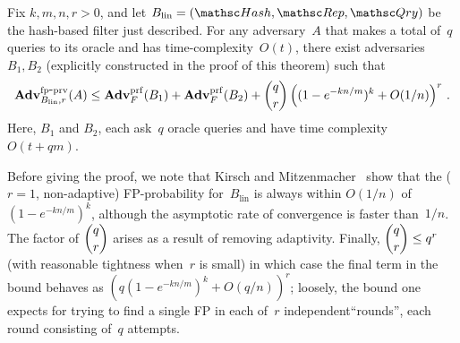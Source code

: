 \begin{theorem}\label{thm1}
Fix $k,m,n,r>0$, and let $B_\mathrm{lin}=(\Hash,\Rep,\Qry)$ be the hash-based filter just described. 
For any adversary~$A$ that makes a total of~$q$ queries to its oracle
and has time-complexity~$O(t)$,
there exist adversaries~$B_1,B_2$ (explicitly constructed in the proof of this theorem) such that
\[
\mathrm{\mathbf{Adv}}^{\mathrm{fp\mbox{-}prv}}_{B_{\mathrm{lin}},r}(A) \leq  \mathbf{Adv}^{\mathrm{prf}}_{F}(B_1) + \mathbf{Adv}^{\mathrm{prf}}_{F}(B_2)  +{\dbinom{q}{r}} \left( (1-e^{-kn/m})^k + O(1/n) \right)^r\,.
\]
Here, $B_1$ and $B_2$, each ask~$q$ oracle queries and have time complexity~$O(t+qm)$.
\end{theorem}
Before giving the proof, we note that Kirsch and Mitzenmacher~\cite{xxx} show
that the ($r=1$, non-adaptive) FP-probability for~$B_\mathrm{lin}$ is
always within $O(1/n)$ of $(1-e^{-kn/m})^k$, although the asymptotic
rate of convergence is faster than~$1/n$.  The factor of $\dbinom{q}{r}$ arises as a result
of removing adaptivity.  Finally, $\dbinom{q}{r} \leq q^r$ (with
reasonable tightness when~$r$ is small) in which case the final term in the bound behaves as 
$(q (1-e^{-kn/m})^k + O(q/n) )^r$; loosely, the bound one expects for
trying to find a single FP in each of~$r$ independent``rounds'', each round
consisting of~$q$ attempts.
%
